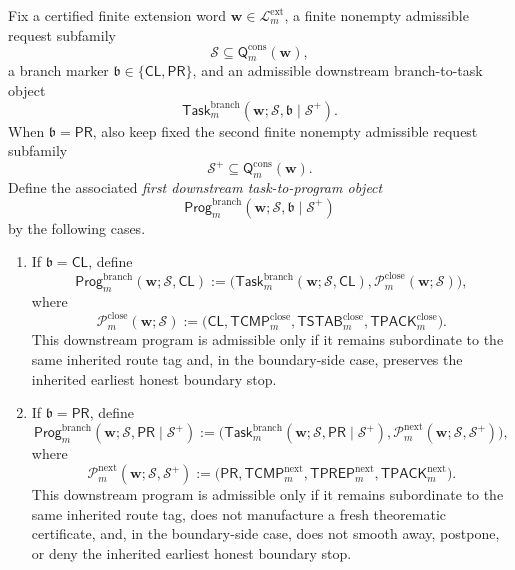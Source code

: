 \begin{definition}
\label{def:first-downstream-task-to-program-object}
Fix a certified finite extension word \(\mathbf w\in\mathcal L^{\mathrm{ext}}_{m}\), a finite nonempty admissible request subfamily
\[
  \mathcal S \subseteq \mathsf{Q}^{\mathrm{cons}}_{m}(\mathbf w),
\]
a branch marker \(\mathfrak b\in\{\mathsf{CL},\mathsf{PR}\}\), and an admissible downstream branch-to-task object
\[
  \mathsf{Task}^{\mathrm{branch}}_{m}(\mathbf w;\mathcal S,\mathfrak b\mid\mathcal S^{+}).
\]
When \(\mathfrak b=\mathsf{PR}\), also keep fixed the second finite nonempty admissible request subfamily
\[
  \mathcal S^{+}\subseteq \mathsf{Q}^{\mathrm{cons}}_{m}(\mathbf w).
\]
Define the associated \emph{first downstream task-to-program object}
\[
  \mathsf{Prog}^{\mathrm{branch}}_{m}(\mathbf w;\mathcal S,\mathfrak b\mid\mathcal S^{+})
\]
by the following cases.
\begin{enumerate}[label=(\roman*)]
  \item If \(\mathfrak b=\mathsf{CL}\), define
\[
  \mathsf{Prog}^{\mathrm{branch}}_{m}(\mathbf w;\mathcal S,\mathsf{CL})
  :=
  \bigl(\mathsf{Task}^{\mathrm{branch}}_{m}(\mathbf w;\mathcal S,\mathsf{CL}),\mathcal P^{\mathrm{close}}_{m}(\mathbf w;\mathcal S)\bigr),
\]
where
\[
  \mathcal P^{\mathrm{close}}_{m}(\mathbf w;\mathcal S)
  :=
  \bigl(\mathsf{CL},\mathsf{TCMP}^{\mathrm{close}}_{m},\mathsf{TSTAB}^{\mathrm{close}}_{m},\mathsf{TPACK}^{\mathrm{close}}_{m}\bigr).
\]
This downstream program is admissible only if it remains subordinate to the same inherited route tag and, in the boundary-side case, preserves the inherited earliest honest boundary stop.

  \item If \(\mathfrak b=\mathsf{PR}\), define
\[
  \mathsf{Prog}^{\mathrm{branch}}_{m}(\mathbf w;\mathcal S,\mathsf{PR}\mid\mathcal S^{+})
  :=
  \bigl(\mathsf{Task}^{\mathrm{branch}}_{m}(\mathbf w;\mathcal S,\mathsf{PR}\mid\mathcal S^{+}),\mathcal P^{\mathrm{next}}_{m}(\mathbf w;\mathcal S,\mathcal S^{+})\bigr),
\]
where
\[
  \mathcal P^{\mathrm{next}}_{m}(\mathbf w;\mathcal S,\mathcal S^{+})
  :=
  \bigl(\mathsf{PR},\mathsf{TCMP}^{\mathrm{next}}_{m},\mathsf{TPREP}^{\mathrm{next}}_{m},\mathsf{TPACK}^{\mathrm{next}}_{m}\bigr).
\]
This downstream program is admissible only if it remains subordinate to the same inherited route tag, does not manufacture a fresh theorematic certificate, and, in the boundary-side case, does not smooth away, postpone, or deny the inherited earliest honest boundary stop.
\end{enumerate}
\end{definition}

